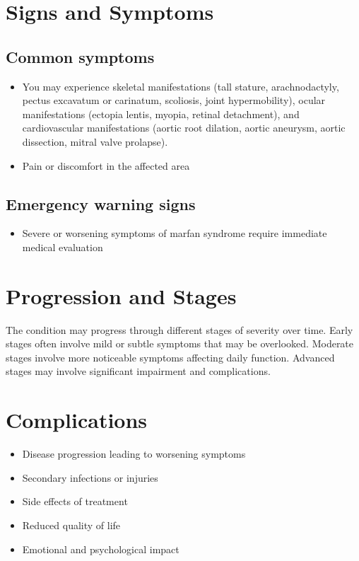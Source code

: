 \section{Signs and Symptoms}

\subsection{Common symptoms}
\begin{itemize}[noitemsep]
  \item You may experience skeletal manifestations (tall stature, arachnodactyly, pectus excavatum or carinatum, scoliosis, joint hypermobility), ocular manifestations (ectopia lentis, myopia, retinal detachment), and cardiovascular manifestations (aortic root dilation, aortic aneurysm, aortic dissection, mitral valve prolapse).
  \item Pain or discomfort in the affected area
  \end{itemize}

\subsection{Emergency warning signs}
\begin{itemize}[noitemsep]
  \item Severe or worsening symptoms of marfan syndrome require immediate medical evaluation
\end{itemize}
\section{Progression and Stages}
The condition may progress through different stages of severity over time. Early stages often involve mild or subtle symptoms that may be overlooked. Moderate stages involve more noticeable symptoms affecting daily function. Advanced stages may involve significant impairment and complications.
\section{Complications}
\begin{itemize}[noitemsep]
  \item Disease progression leading to worsening symptoms
  \item Secondary infections or injuries
  \item Side effects of treatment
  \item Reduced quality of life
  \item Emotional and psychological impact
\end{itemize}
